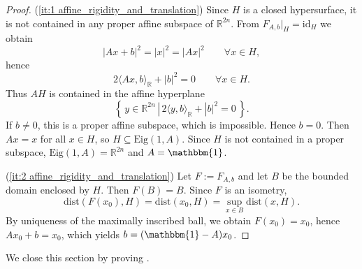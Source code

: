 \documentclass[11pt,reqno]{amsart}
\newcommand{\IR}{{\mathbb R}}%
\newcommand{\dist}{\mathrm{dist}}
\theoremstyle{plain}
\theoremstyle{definition}
\numberwithin{equation}{section}
\def\id{\mathrm{id}}
\newcommand{\set}[2]{\left\{ \, #1  \, | \,  #2 \, \right\}}
\begin{document}
\begin{proof}
(\ref{it:1 affine_rigidity_and_translation}) Since $H$ is a closed hypersurface, it is not contained in any proper affine subspace of $\IR^{2n}$. From $F_{A,b}|_H=\id_H$ we obtain
\[
|Ax+b|^2 = |x|^2 = |Ax|^2 \qquad \forall x\in H,
\]
hence
\[
2\langle Ax,b\rangle_{\IR} + |b|^2 = 0 \qquad \forall x\in H.
\]
Thus $AH$ is contained in the affine hyperplane
\[
\set{y \in \IR^{2n}}{2\langle y,b\rangle_{\IR} + |b|^2 = 0}.
\]
If $b\neq 0$, this is a proper affine subspace, which is impossible. Hence $b=0$. Then $Ax=x$ for all $x\in H$, so $H \subseteq \mathrm{Eig}(1,A)$. Since $H$ is not contained in a proper subspace, $\mathrm{Eig}(1,A)=\IR^{2n}$ and $A=\mathbbm{1}$.

(\ref{it:2 affine_rigidity_and_translation}) Let $F:=F_{A,b}$ and let $B$ be the bounded domain enclosed by $H$. Then $F(B)=B$. Since $F$ is an isometry,
\[
\dist(F(x_0),H)=\dist(x_0,H)=\sup_{x\in B}\dist(x,H).
\]
By uniqueness of the maximally inscribed ball, we obtain $F(x_0)=x_0$, hence $Ax_0+b=x_0$, which yields $b=(\mathbbm{1}-A)x_0$.
\end{proof}
We close this section by proving .
\end{document}
